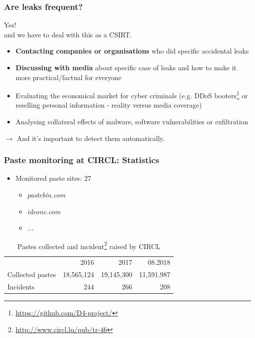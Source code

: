 \begin{frame}
    \frametitle{Are leaks frequent?}
    \begin{center}
    \Large{Yes!}\\ and we have to deal with this as a CSIRT.
    \end{center}

    \begin{itemize}
            \item {\bf Contacting companies or organisations} who did specific accidental leaks
            \item {\bf Discussing with media} about specific case of leaks and how to make it more practical/factual for everyone
            \item Evaluating the economical market for cyber criminals (e.g. DDoS booters\footnote{\url{https://github.com/D4-project/}} or reselling personal information - reality versus media coverage)
            \item Analysing collateral effects of malware, software vulnerabilities or exfiltration
    \end{itemize}

    \begin{center}
    $\rightarrow$ And it's important to detect them automatically.
    \end{center}
\end{frame}

\begin{frame}
    \frametitle{Paste monitoring at CIRCL: Statistics}
    \begin{itemize}
        \item Monitored paste sites: 27
            \begin{itemize}
                \item \textit{pastebin.com}
                \item \textit{ideone.com}
                \item \textit{...}
            \end{itemize}
    \end{itemize}
    \begin{table}[h]
    \centering
    \begin{tabular}{|lrrr|}
        \hline
        \rowcolor{lightgray} & 2016 & 2017 & 08.2018\\
        Collected pastes & 18,565,124 & 19,145,300 & 11,591,987 \\
        Incidents & 244 & 266 & 208\\
        \hline
    \end{tabular}
    \caption{Pastes collected and incident\footnote{\url{http://www.circl.lu/pub/tr-46}} raised by CIRCL}
    \label{circlStats}
\end{table}

\end{frame}

